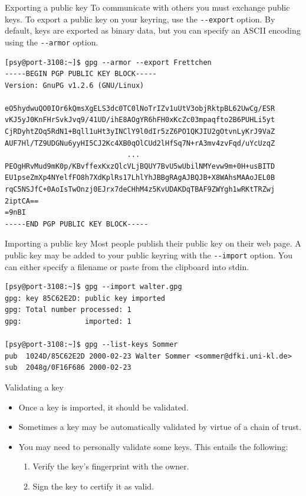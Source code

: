 \documentclass[%
mode=present,%
paper=smartboard,
size=20pt,
]{powerdot}
\newcommand{\clopt}[1]{\texttt{{-}#1}}
\begin{document}
\makeatletter\renewcommand{\verbatim@font}{\scriptsize\tt}\makeatother
\begin{slide}[method=direct]{Exporting a public key}
To communicate with others you must exchange public keys.  To export a
public key on your keyring, use the \clopt{-export} option.  By
default, keys are exported as binary data, but you can specify an
ASCII encoding using the \clopt{-armor} option.\\[1ex]
\begin{verbatim}
[psy@port-3108:~]$ gpg --armor --export Frettchen
-----BEGIN PGP PUBLIC KEY BLOCK-----
Version: GnuPG v1.2.6 (GNU/Linux)

eO5hydwuQO0IOr6kQmsXgELS3dc0TC0lNoTrIZv1uUtV3objRktpBL62UwCg/ESR
vKJ5yJ0KnFHrSvkJvq9/41UD/ihE8AOgYR6hFH0xKcZc03mpaqfto2B6PUHLi5yt
CjRDyhtZOq5RdN1+Bqll1uHt3yINClY9l0dIr5zZ6PO1QKJIU2gOtvnLyKrJ9VaZ
AUF7Hl/TZ9UDGNu6yyHI5CJ2Kc4XB0qOlCUd2lHfSq7N+rA3mv4zvFqd/uYcUzqZ
                             ...
PEOgHRvMud9mK0p/KBvffexKxzQlcVLjBQUY7BvU5wUbilNMYevw9m+0H+usBITD
EU1pseZmXp4NYelfFO8h7XdKplRs17LhlYhJBBgRAgAJBQJB+X8WAhsMAAoJEL0B
rqC5NSJfC+0AoIsTwOnzj0EJrx7deCHhM4z5KvUDAKDqTBAF9ZWYgh1wRKtTRZwj
2iptCA==
=9nBI
-----END PGP PUBLIC KEY BLOCK-----
\end{verbatim}%
\end{slide}

\begin{slide}[method=direct]{Importing a public key}
  Most people publish their public key on their web page.  A public
  key may be added to your public keyring with the \clopt{-import}
  option. You can either specify a filename or paste from the
  clipboard into stdin.\\[1ex]
\begin{verbatim}
[psy@port-3108:~]$ gpg --import walter.gpg
gpg: key 85C62E2D: public key imported
gpg: Total number processed: 1
gpg:               imported: 1

[psy@port-3108:~]$ gpg --list-keys Sommer
pub  1024D/85C62E2D 2000-02-23 Walter Sommer <sommer@dfki.uni-kl.de>
sub  2048g/0F16F686 2000-02-23
\end{verbatim}
\end{slide}

\begin{slide}{Validating a key}
  \begin{itemize}
  \item Once a key is imported, it should be validated.
  \item Sometimes a key may be automatically validated by virtue of a
    chain of trust.
  \item You may need to personally validate some keys.  This entails
    the following:
    \begin{enumerate}
    \item Verify the key's fingerprint with the owner.
    \item Sign the key to certify it as valid.
    \end{enumerate}
  \end{itemize}
\end{slide}
\end{document}
